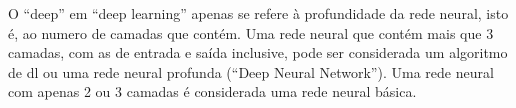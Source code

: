O ``deep'' em ``deep learning'' apenas se refere à profundidade da rede neural, isto é, ao numero de camadas que contém. Uma rede neural que contém mais que 3 camadas, com as de entrada e saída inclusive, pode ser considerada um algoritmo de \ac{dl} ou uma rede neural profunda (``Deep Neural Network''). Uma rede neural com apenas 2 ou 3 camadas é considerada uma rede neural básica.